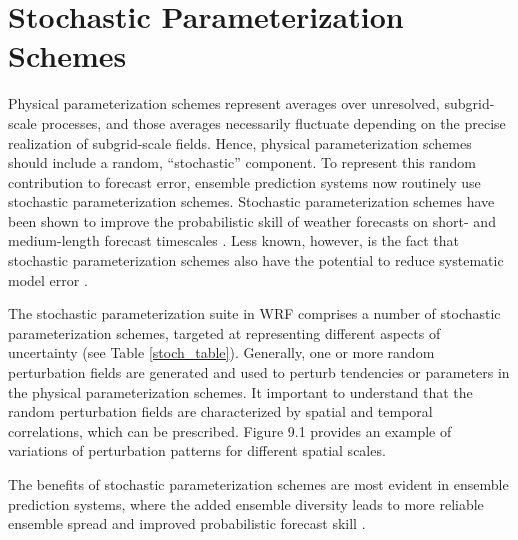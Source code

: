 \chapter{Stochastic Parameterization Schemes}
\label{stoch}

Physical parameterization schemes represent averages over unresolved,
subgrid-scale processes, and those averages necessarily 
fluctuate depending on the precise realization of subgrid-scale
fields.  Hence, physical parameterization schemes should include a random,
``stochastic'' component.  To represent this random contribution to
forecast error, ensemble prediction systems now routinely use stochastic
parameterization schemes.
Stochastic parameterization schemes have been shown to improve the
probabilistic skill of weather forecasts on short- and medium-length forecast
timescales 
\citep[e.g.][]{Be09,Be11,leutbecher2017stochastic}.
Less known, however, is the fact that stochastic parameterization schemes also have the
potential to reduce systematic model error 
\citep[e.g.][]{berner2017stochastic}.

The stochastic parameterization suite in WRF comprises a number of
stochastic parameterization schemes, targeted at representing different aspects 
of uncertainty (see Table \ref{stoch_table}). Generally, one or more random
perturbation fields are generated and used to perturb tendencies or
parameters in the physical parameterization schemes.  It important to understand 
that the random perturbation fields are characterized by spatial and temporal
correlations, which can be prescribed.  Figure 9.1 provides an example of 
variations of perturbation patterns for different spatial scales.

The benefits of stochastic parameterization schemes are most evident in ensemble 
prediction systems, where the added ensemble diversity leads to more reliable 
ensemble spread and improved probabilistic forecast skill \citep[e.g.][]{Be15}.

